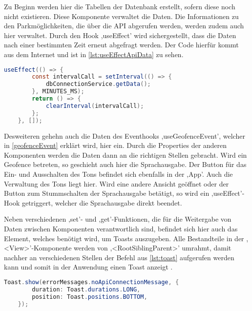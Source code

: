 Zu Beginn werden hier die Tabellen der Datenbank erstellt, sofern diese noch nicht existieren. Diese Komponente verwaltet die Daten. Die Informationen zu den Parkmöglichkeiten, die über die API abgerufen werden, werden zudem auch hier verwaltet. Durch den Hook ,useEffect' wird sichergestellt, dass die Daten nach einer bestimmten Zeit erneut abgefragt werden. Der Code hierfür kommt aus dem Internet und ist in \autoref{lst:useEffectApiData} zu sehen.

\begin{lstlisting}[caption={In diesem Hook werden nach der Zeit, welche sich hinter der Variable ,MINUTES\_MS' verbirgt, die Daten der API abgerufen, was über die Funktion in Zeile 3 geschieht. (Quelle: \cite{useIntervalCode})},captionpos=b, language=Java, label=lst:useEffectApiData]
	useEffect(() => {
		const intervalCall = setInterval(() => {
			dbConnectionService.getData();
		}, MINUTES_MS);
		return () => {
			clearInterval(intervalCall);
		};
	}, []);
\end{lstlisting}

Desweiteren gehehn auch die Daten des Eventhooks ,useGeofenceEvent', welcher in \autoref{geofenceEvent} erklärt wird, hier ein. Durch die Properties der anderen Komponenten werden die Daten dann an die richtigen Stellen gebracht. Wird ein Geofence betreten, so geschieht auch hier die Sprachausgabe. Der Button für das Ein- und Ausschalten des Tons befindet sich ebenfalls in der ,App'. Auch die Verwaltung des Tons liegt hier. Wird eine andere Ansicht geöffnet oder der Button zum Stummschalten der Sprachausgabe betätigt, so wird ein ,useEffect'-Hook getriggert, welcher die Sprachausgabe direkt beendet.

Neben verschiedenen ,set'- und ,get'-Funktionen, die für die Weitergabe von Daten zwischen Komponenten verantwortlich sind, befindet sich hier auch das Element, welches benötigt wird, um Toasts auszugeben. Alle Bestandteile in der ,<View>'-Komponente werden von ,<RootSiblingParent>' umrahmt, damit nachher an verschiedenen Stellen der Befehl aus \autoref{lst:toast} aufgerufen werden kann und somit in der Anwendung einen Toast anzeigt \cite{toastLibrary}.

\begin{lstlisting}[caption={Ein Beispiel des Aufrufs eines Toasts aus der Datei DbConnectionService. (Quelle: Eigene Implementierung)},captionpos=b, language=Java, label=lst:toast]
	Toast.show(errorMessages.noApiConnectionMessage, {
		duration: Toast.durations.LONG,
		position: Toast.positions.BOTTOM,
	});
\end{lstlisting}

